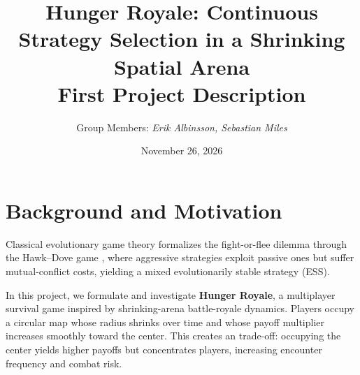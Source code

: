 \documentclass[10pt,a4paper]{article}
\title{\vspace{-1.4cm}\textbf{Hunger Royale: Continuous Strategy Selection in a Shrinking Spatial Arena}\\[4pt]
\large First Project Description}
\author{Group Members: \textit{Erik Albinsson, Sebastian Miles}}
\date{November 26, 2026}
\begin{document}
\maketitle
\vspace{-0.8cm}

\section{Background and Motivation}
Classical evolutionary game theory formalizes the fight-or-flee dilemma through the Hawk--Dove game \cite{maynard1973,maynard1982}, where aggressive strategies exploit passive ones but suffer mutual-conflict costs, yielding a mixed evolutionarily stable strategy (ESS).

In this project, we formulate and investigate \textbf{Hunger Royale}, a multiplayer survival game inspired by shrinking-arena battle-royale dynamics. Players occupy a circular map whose radius shrinks over time and whose payoff multiplier increases smoothly toward the center. This creates an trade-off: occupying the center yields higher payoffs but concentrates players, increasing encounter frequency and combat risk.
\end{document}
